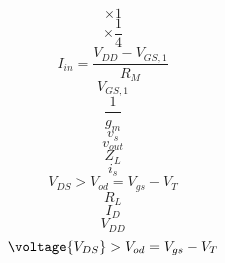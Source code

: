 \documentclass[letterpaper 12pt]{book}
\begin{document}
\[ \times 1 \]
\[ \times \frac{1}{4} \]
\[ I_{in} = \frac{V_{DD} - V_{GS,1}}{R_M} \]
\[ V_{GS,1} \]
\[ \frac{1}{g_m} \]
\[ v_s \]
\[ v_{out} \]
\[ Z_L \]
\[ i_s \]
\[ V_{DS} > V_{od} = V_{gs} - V_T\]
\[ R_L \]
\[ I_D \]
\[ V_{DD} \]
\[ \voltage{V_{DS}} > V_{od} = V_{gs} - V_T\]
\end{document}
